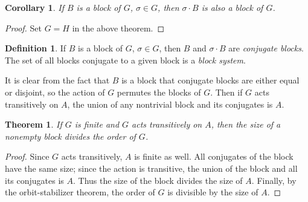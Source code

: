 \documentclass[12pt]{article}
\newtheorem*{thm}{Theorem}
\newtheorem*{cor}{Corollary}
\theoremstyle{definition}
\newtheorem*{defn}{Definition}
\begin{document}
\begin{cor} If $B$ is a block of $G$, $\sigma\in G$, then $\sigma\cdot B$ is also a block of $G$.
\end{cor}
\begin{proof}
Set $G=H$ in the above theorem.
\end{proof}

\begin{defn} If $B$ is a block of $G$, $\sigma\in G$, then $B$ and $\sigma\cdot B$ are \emph{conjugate blocks}. The set of all blocks conjugate to a given block is a \emph{block system}.
\end{defn}

It is clear from the fact that $B$ is a block that conjugate blocks are either equal or disjoint, so the action of $G$ permutes the blocks of $G$. Then if $G$ acts transitively on $A$, the union of any nontrivial block and its conjugates is $A$.

\begin{thm} If $G$ is finite and $G$ acts transitively on $A$, then the size of a nonempty block divides the order of $G$.
\end{thm}
\begin{proof} Since $G$ acts transitively, $A$ is finite as well. All conjugates of the block have the same size; since the action is transitive, the union of the block and all its conjugates is $A$. Thus the size of the block divides the size of $A$. Finally, by the orbit-stabilizer theorem, the order of $G$ is divisible by the size of $A$.
\end{proof}
\end{document}
